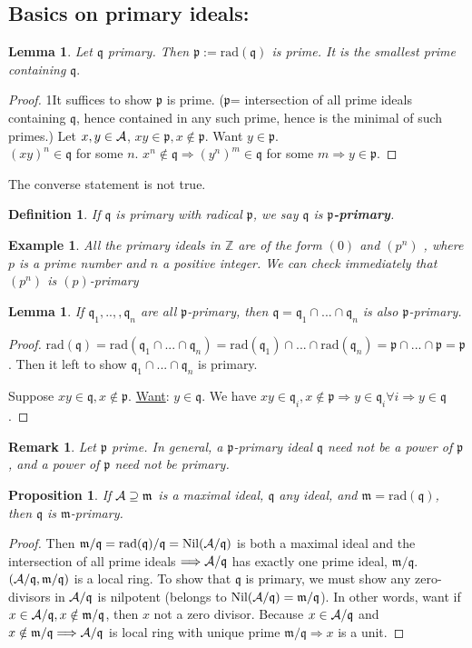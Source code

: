 \documentclass[11pt]{article}
\newtheorem{prop}[thm]{Proposition}
\newtheorem{lemma}[thm]{Lemma}
\newtheorem{dfn}[thm]{Definition}
\newtheorem{rmk}[thm]{Remark}
\newtheorem{ex}[thm]{Example}
\newcommand{\intg}{\mathbb Z}
\newcommand{\scm}{{\mathfrak m}}
\newcommand{\scp}{{\mathfrak p}}
\newcommand{\scq}{\mathfrak q}
\newcommand{\cala}{{\cal A}}
\newcommand{\Lrta}{\Longrightarrow}
\begin{document}
\subsection*{Basics on primary ideals:}
\begin{lemma}
Let $\scq$ primary. Then $\scp:=\text{rad}(\scq)$ is prime. It is the smallest prime containing $\scq.$
\end{lemma}
\begin{proof}
1It suffices to show $\scp$ is prime. ($\scp$= intersection of all prime ideals containing $\scq$, hence contained in any such prime, hence is the minimal of such primes.) Let $x,y\in\cala$, $xy\in\scp,x\notin \scp$. Want $y\in\scp$.\\
 $(xy)^n\in\scq$ for some $n$. $x^n\notin\scq\Lrta (y^n)^m\in\scq $ for some $m$$\Lrta  y\in\scp$.
\end{proof}

The converse statement is not true.
\begin{dfn}
If $\scq$ is primary with radical $\scp$, we say $\scq$ is  \textbf{$\scp$-primary}.
\end{dfn}
\begin{ex}
All the primary ideals in $\intg$ are of the form $(0)$ and $(p^n)$ , where $p$ is a prime number and $n$ a positive integer. We can check immediately that $(p^n)$ is $(p)$-primary
\end{ex}
\begin{lemma}
If $\scq_1,..,,\scq_n$ are all $\scp$-primary, then $\scq=\scq_1\cap...\cap \scq_n$ is also $\scp$-primary.
\end{lemma}
\begin{proof}
 $\text{rad}(\scq)=\text{rad}(\scq_1\cap...\cap\scq_n)=\text{rad}(\scq_1)\cap...\cap \text{rad}(\scq_n)=\scp\cap...\cap \scp=\scp$. Then it left to show $\scq_1\cap...\cap\scq_n$ is primary. 

Suppose $xy\in\scq, x\notin \scp$. \underline{Want}: $y\in \scq$. We have $xy\in \scq_i,x\notin\scp\Lrta y\in \scq_i\forall i\Lrta y\in\scq$.
\end{proof}
\begin{rmk}
Let $\scp$ prime. In general, a $\scp$-primary ideal $\scq$ need not be a power of $\scp$, and a power of $\scp$ need not be primary.
\end{rmk}
\begin{prop}\label{lem:rad_maximal_primary}
If $\cala\supseteq\scm$ is a  maximal ideal, $\scq$ any ideal, and $\scm=\text{rad}(\scq)$, then $\scq$ is $\scm$-primary.
\end{prop}
\begin{proof}
Then $\scm/\scq=\text{rad}(\scq)/\scq=\text{Nil}(  \cala/\scq)$ is both a maximal ideal and the intersection of all prime ideals $\Lrta\cala/\scq$ has exactly one prime ideal, $\scm/\scq$. $(\cala/\scq,\scm/\scq)$ is a local ring. To show that $\scq$ is primary, we must show any zero-divisors  in $\cala/\scq$ is nilpotent (belongs to $\text{Nil}(  \cala/\scq)=\scm/\scq$). In other words, want if $x\in\cala/\scq,x\notin\scm/\scq$, then $x$ not a zero divisor. Because $x\in\cala/\scq $ and $ x\notin \scm/\scq\Lrta \cala/\scq $ is local ring with unique prime $\scm/\scq\Lrta x$ is a unit.
\end{proof}
\end{document}
